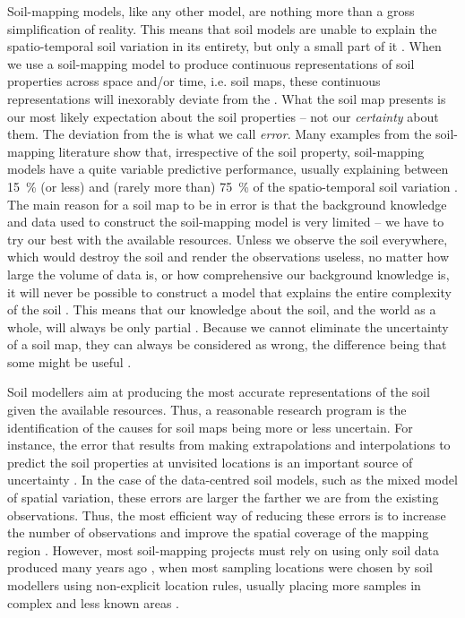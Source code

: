 Soil-mapping models, like any other model, are nothing more than a gross simplification of reality.
This means that soil models are unable to explain the spatio-temporal soil variation in
its entirety, but only a small part of it \cite{Heuvelink1998a, Legros2006}. When we use a
soil-mapping model to produce continuous representations of soil properties across space and/or time,
i.e. soil maps, these continuous representations will inexorably deviate from the . What
the soil map presents is our most likely expectation about the soil properties -- not our
\emph{certainty} about them. The deviation from the  is what we call \emph{error}. Many
examples from the soil-mapping literature show that, irrespective of the soil property, soil-mapping
models have a quite variable predictive performance, usually explaining between \SI{15}{\percent}
(or less) and (rarely more than) \SI{75}{\percent} of the spatio-temporal soil variation
\cite{MooreEtAl1993, OdehEtAl1994, GesslerEtAl1995, McKenzieEtAl1999, GobinEtAl2001, SumflethEtAl2008, 
SunEtAl2012, ViscarraRosselEtAl2013, NussbaumEtAl2014, HenglEtAl2015, GaschEtAl2015, HeungEtAl2016}.
The main reason for a soil map to be in error is that the background knowledge and data used to
construct the soil-mapping model is very limited -- we have to try our best with the available
resources. Unless we observe the soil everywhere, which would destroy the soil and render the
observations useless, no matter how large the volume of data is, or how comprehensive our background
knowledge is, it will never be possible to construct a model that explains the entire complexity of
the soil \cite{Tukey1997}. This means that our knowledge about the soil, and the world as a whole,
will always be only partial \cite{Box1993}. Because we cannot eliminate the uncertainty of a soil
map, they can always be considered as wrong, the difference being that some might be useful
\cite{Box1976}.

Soil modellers aim at producing the most accurate representations of the soil given the
available resources. Thus, a reasonable research program is the identification of the causes for
soil maps being more or less uncertain. For instance, the error that results from making
extrapolations and interpolations to predict the soil properties at unvisited locations is an
important source of uncertainty \cite{HeuvelinkEtAl1999, RefsgaardEtAl2006}. In the case of the
data-centred soil models, such as the mixed model of spatial variation, these errors are
larger the farther we are from the existing observations. Thus, the most efficient way of reducing
these errors is to increase the number of observations and improve the spatial coverage of the mapping
region \cite{BrusEtAl2007a}. However, most soil-mapping projects must rely on using only soil
data produced many years ago \cite{KempenEtAl2009, HenglEtAl2014, PoggioEtAl2014, NussbaumEtAl2014, 
MulderEtAl2016}, when most sampling locations were chosen by soil modellers using non-explicit
location rules, usually placing more samples in complex and less known areas \cite{Rossiter2000}.

